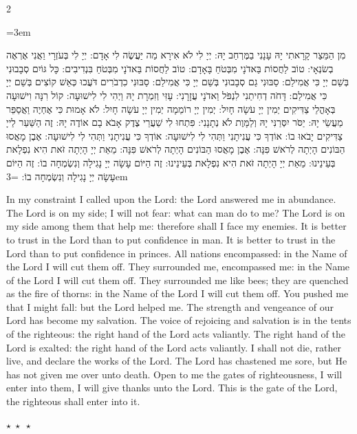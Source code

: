 \documentclass[11pt, openany]{book}
\newenvironment{bilingual}{%
  \par\vspace{4pt}%
  \begin{paracol}{2}%
}{%
  \end{paracol}%
  \par\vspace{2pt}%
}
\newenvironment{hebrewcol}{%
  \switchcolumn[1]%
  \begingroup
  \RTL
  \hebrewfont\large
  \setstretch{1.4}%
  \emergencystretch=3em
  \tolerance=9999
  \parindent=0pt\relax
}{%
  \endRTL
  \endgroup
}
\newenvironment{englishcol}{%
  \switchcolumn[0]%
  \begingroup
  \setstretch{1.4}%
  \emergencystretch=3em
  \tolerance=9999
  \normalsize
  \rightskip=0.12in\relax
}{%
  \endgroup
}
\newcommand{\parasep}{%
  \par\vspace{3pt}
  \begin{center}
    \textcolor{sedergold!50}{\small$\star\;\star\;\star$}
  \end{center}
  \par\vspace{3pt}
}
\begin{document}
\begin{bilingual}
\begin{hebrewcol}
מִן הַמֵּצַר קָרָאתִי יָהּ עָנָנִי בַמֶּרְחַב יָהּ: יְיָ לִי לֹא אִירָא מַה יַּעֲשֶׂה לִי אָדָם: יְיָ לִי בְּעֹזְרָי וַאֲנִי אֶרְאֶה בְשׂנְאָי: טוֹב לַחֲסוֹת בַּאדֹנָי מִבְּטֹחַ בָּאָדָם: טוֹב לַחֲסוֹת בַּאדֹנָי מִבְּטֹחַ בִּנְדִיבִים: כָּל גּוֹיִם סְבָבוּנִי בְּשֵׁם יְיָ כִּי אֲמִילַם: סַבּוּנִי גַם סְבָבוּנִי בְּשֵׁם יְיָ כִּי אֲמִילַם: סַבּוּנִי כִדְבֹרִים דֹּעֲכוּ כְּאֵשׁ קוֹצִים בְּשֵׁם יְיָ כִּי אֲמִילַם: דָּחֹה דְחִיתַנִי לִנְפֹּל וַאדֹנָי עֲזָרָנִי: עָזִּי וְזִמְרָת יָהּ וַיְהִי לִי לִישׁוּעָה: קוֹל רִנָּה וִישׁוּעָה בְּאָהֳלֵי צַדִּיקִים יְמִין יְיָ עֹשָׂה חָיִל: יְמִין יְיָ רוֹמֵמָה יְמִין יְיָ עֹשָׂה חָיִל: לֹא אָמוּת כִּי אֶחְיֶה וַאֲסַפֵּר מַעֲשֵׂי יָהּ: יַסֹּר יִסְּרַנִּי יָהּ וְלַמָּוֶת לֹא נְתָנָנִי: פִּתְחוּ לִי שַׁעֲרֵי צֶדֶק אָבֹא בָם אוֹדֶה יָהּ: זֶה הַשַּׁעַר לַייָ צַדִּיקִים יָבֹאוּ בוֹ: אוֹדְךָ כִּי עֲנִיתָנִי וַתְּהִי לִי לִישׁוּעָה: אוֹדְךָ כִּי עֲנִיתָנִי וַתְּהִי לִי לִישׁוּעָה: אֶבֶן מָאֲסוּ הַבּוֹנִים הָיְתָה לְרֹאשׁ פִּנָּה: אֶבֶן מָאֲסוּ הַבּוֹנִים הָיְתָה לְרֹאשׁ פִּנָּה: מֵאֵת יְיָ הָיְתָה זֹּאת הִיא נִפְלָאת בְּעֵינֵינוּ: מֵאֵת יְיָ הָיְתָה זֹּאת הִיא נִפְלָאת בְּעֵינֵינוּ: זֶה הַיּוֹם עָשָׂה יְיָ נָגִילָה וְנִשְׂמְחָה בוֹ: זֶה הַיּוֹם עָשָׂה יְיָ נָגִילָה וְנִשְׂמְחָה בוֹ:
\end{hebrewcol}
\begin{englishcol}
In my constraint I called upon the Lord: the Lord answered me in abundance. The Lord is on my side; I will not fear: what can man do to me? The Lord is on my side among them that help me: therefore shall I face my enemies. It is better to trust in the Lord than to put confidence in man. It is better to trust in the Lord than to put confidence in princes. All nations encompassed: in the Name of the Lord I will cut them off. They surrounded me, encompassed me: in the Name of the Lord I will cut them off. They surrounded me like bees; they are quenched as the fire of thorns: in the Name of the Lord I will cut them off. You pushed me that I might fall: but the Lord helped me. The strength and vengeance of our Lord has become my salvation. The voice of rejoicing and salvation is in the tents of the righteous: the right hand of the Lord acts valiantly. The right hand of the Lord is exalted: the right hand of the Lord acts valiantly. I shall not die, rather live, and declare the works of the Lord. The Lord has chastened me sore, but He has not given me over unto death. Open to me the gates of righteousness, I will enter into them, I will give thanks unto the Lord. This is the gate of the Lord, the righteous shall enter into it.
\end{englishcol}
\end{bilingual}
\parasep
\end{document}
